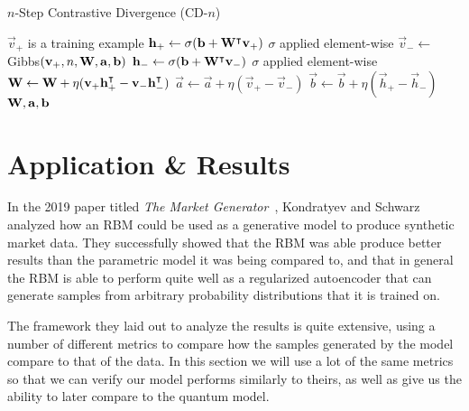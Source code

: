 \begin{algorithm}
    \caption{$n$-Step Contrastive Divergence (CD-$n$)}
\begin{algorithmic}[1]
        \Comment $\vec{v}_+$ is a training example
        \State $\mathbf{h}_+ \gets \sigma(\mathbf{b} + \mathbf{W}^\intercal\mathbf{v}_+)$
            \Comment $\sigma$ applied element-wise
        \State $\vec{v}_- \gets$ Gibbs$(\mathbf{v}_+,n,\mathbf{W},\mathbf{a},\mathbf{b})$
        \State $\mathbf{h}_- \gets \sigma(\mathbf{b} + \mathbf{W}^\intercal\mathbf{v}_-)$
            \Comment $\sigma$ applied element-wise
        \State $\mathbf{W} \gets \mathbf{W} + \eta(\mathbf{v}_+ \mathbf{h}_+^\intercal - \mathbf{v}_- \mathbf{h}_-^\intercal)$
        \State $\vec{a} \gets \vec{a} + \eta(\vec{v}_+ - \vec{v}_-)$
        \State $\vec{b} \gets \vec{b} + \eta(\vec{h}_+ - \vec{h}_-)$
        \State \Return $\mathbf{W}, \mathbf{a}, \mathbf{b}$
    \EndProcedure
\end{algorithmic}
\label{alg:CDn}
\end{algorithm}


\section{Application \& Results}
In the 2019 paper titled \textit{The Market Generator}~\cite{kondratyev_2019}, Kondratyev and Schwarz analyzed how an RBM could be used as a generative model to produce synthetic market data.
They successfully showed that the RBM was able produce better results than the parametric model it was being compared to, and that in general the RBM is able to perform quite well as a regularized autoencoder that can generate samples from arbitrary probability distributions that it is trained on.

The framework they laid out to analyze the results is quite extensive, using a number of different metrics to compare how the samples generated by the model compare to that of the data.
In this section we will use a lot of the same metrics so that we can verify our model performs similarly to theirs, as well as give us the ability to later compare to the quantum model.


